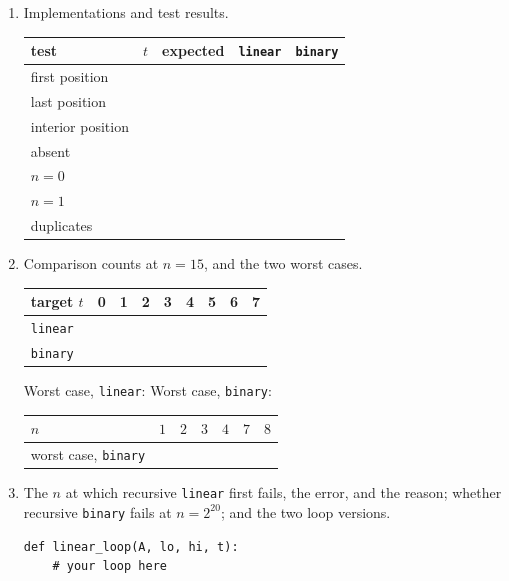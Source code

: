\documentclass[11pt]{article}
\newenvironment{parts}{\begin{enumerate}[label=\textbf{(\alph*)}, leftmargin=*]}
                      {\end{enumerate}}
\begin{document}
\begin{parts}
  \item Implementations and test results.
    \begin{center}
    \begin{tabular}{llccc}
      \toprule
      test & $t$ & expected & \texttt{linear} & \texttt{binary} \\
      \midrule
      first position    & & & & \\
      last position     & & & & \\
      interior position & & & & \\
      absent            & & & & \\
      $n = 0$           & & & & \\
      $n = 1$           & & & & \\
      duplicates        & & & & \\
      \bottomrule
    \end{tabular}
    \end{center}

  \item Comparison counts at $n = 15$, and the two worst cases.
    \begin{center}
    \begin{tabular}{l*{8}{c}}
      \toprule
      target $t$ & 0 & 1 & 2 & 3 & 4 & 5 & 6 & 7 \\
      \midrule
      \texttt{linear} & & & & & & & & \\
      \texttt{binary} & & & & & & & & \\
      \bottomrule
    \end{tabular}
    \end{center}
    Worst case, \texttt{linear}: \qquad Worst case, \texttt{binary}:
    \begin{center}
    \begin{tabular}{lcccccc}
      \toprule
      $n$ & $1$ & $2$ & $3$ & $4$ & $7$ & $8$ \\
      \midrule
      worst case, \texttt{binary} & & & & & & \\
      \bottomrule
    \end{tabular}
    \end{center}

  \item The $n$ at which recursive \texttt{linear} first fails, the error, and
    the reason; whether recursive \texttt{binary} fails at $n = 2^{20}$; and the
    two loop versions.
    \begin{lstlisting}[numbers=none]
def linear_loop(A, lo, hi, t):
    # your loop here


\end{lstlisting}
\end{parts}
\end{document}
